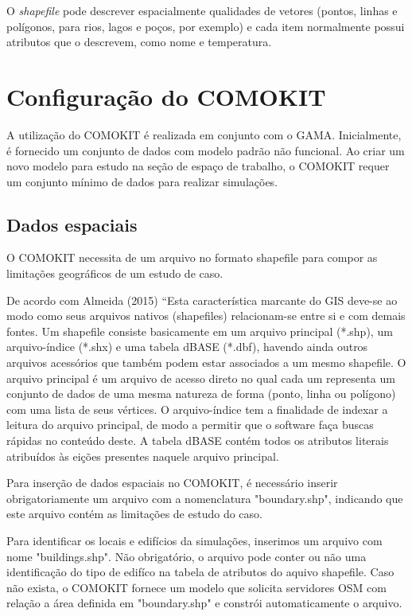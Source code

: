 
O \textit{shapefile} pode descrever espacialmente qualidades de vetores (pontos, linhas e polígonos, para rios, lagos e poços, por exemplo) e cada item normalmente possui atributos que o descrevem, como nome e temperatura. \cite{41Format2:online}


\section{Configuração do COMOKIT}

A utilização do COMOKIT é realizada em conjunto com o GAMA. Inicialmente, é fornecido um conjunto de dados com modelo padrão não funcional. 
Ao criar um novo modelo para estudo na seção de espaço de trabalho, o COMOKIT requer um conjunto mínimo de dados \cite{ComokitDoc} para realizar simulações.

\subsection{Dados espaciais}

O COMOKIT necessita de um arquivo no formato shapefile para compor as limitações geográficos de um estudo de caso. 

De acordo com Almeida (2015) “Esta característica marcante do GIS deve-se ao modo como seus arquivos nativos (shapefiles) relacionam-se entre si e com demais fontes. Um shapefile consiste basicamente em um arquivo principal (*.shp), um arquivo-índice (*.shx) e uma tabela dBASE (*.dbf), havendo ainda outros arquivos acessórios que também podem estar associados a um mesmo shapefile. O arquivo principal é um arquivo de acesso direto no qual cada um representa um conjunto de dados de uma mesma natureza de forma (ponto, linha ou polígono) com uma lista de seus vértices. O arquivo-índice tem a finalidade de indexar a leitura do arquivo principal, de modo a permitir que o software faça buscas rápidas no conteúdo deste. A tabela dBASE contém todos os atributos literais atribuídos às eições presentes naquele arquivo principal. \cite{almeida2015integraccao}

Para inserção de dados espaciais no COMOKIT, é necessário inserir obrigatoriamente um arquivo com a nomenclatura "boundary.shp", indicando que este arquivo contém as limitações de estudo do caso.

Para identificar os locais e edifícios da simulações, inserimos um arquivo com nome "buildings.shp". Não obrigatório, o arquivo pode conter ou não uma identificação do tipo de edifíco na tabela de atributos do aquivo shapefile. Caso não exista, o COMOKIT fornece um modelo que solicita servidores OSM com relação
a área definida em "boundary.shp" e constrói automaticamente o arquivo.


